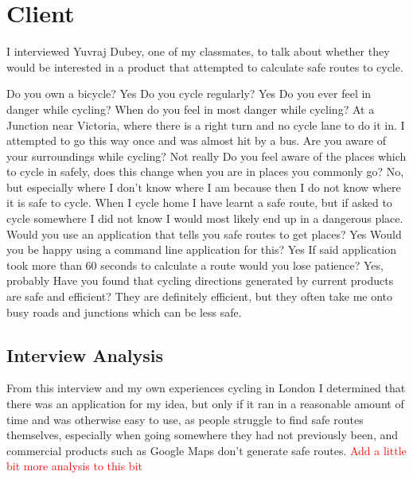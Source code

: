\documentclass[11pt,twoside,a4paper]{report}
\begin{document}
\section{Client}
I interviewed Yuvraj Dubey, one of my classmates, to talk about whether they would be interested in a product that attempted to calculate safe routes to cycle. 
\begin{dialogue}
    Do you own a bicycle?
     Yes
     Do you cycle regularly?
     Yes
    Do you ever feel in danger while cycling?
    When do you feel in most danger while cycling?
    At a Junction near Victoria, where there is a right turn and no cycle lane to do it in. I attempted to go this way once and was almost hit by a bus.
    Are you aware of your surroundings while cycling?
    Not really
     Do you feel aware of the places which to cycle in safely, does this change when you are in places you commonly go?
    No, but especially where I don't know where I am because then I do not know where it is safe to cycle. When I cycle home I have learnt a safe route, but if asked to cycle somewhere I did not know I would most likely end up in a dangerous place.
    Would you use an application that tells you safe routes to get places?
    Yes
    Would you be happy using a command line application for this?
    Yes
    If said application took more than 60 seconds to calculate a route would you lose patience?
    Yes, probably
    Have you found that cycling directions generated by current products are safe and efficient?
    They are definitely efficient, but they often take me onto busy roads and junctions which can be less safe.
\end{dialogue}
\subsection{Interview Analysis}
From this interview and my own experiences cycling in London I determined that there was an application for my idea, but only if it ran in a reasonable amount of time and was otherwise easy to use, as people struggle to find safe routes themselves, especially when going somewhere they had not previously been, and commercial
products such as Google Maps don't generate safe routes. 
\textcolor{red}{Add a little bit more analysis to this bit}
\newpage
\end{document}

